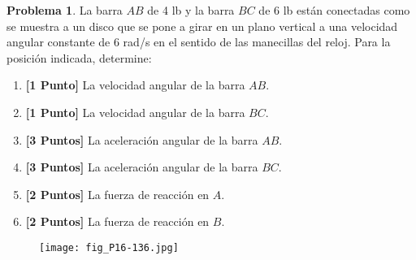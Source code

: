 \documentclass[ a4paper, twoside, 11pt]{article}
\theoremstyle{definition}
\newtheorem{problem}[definition]{Problema}
\begin{document}
\begin{problem}
La barra $AB$ de 4 lb y la barra $BC$ de 6 lb est\'an conectadas como se muestra a un disco que se pone a girar en un plano vertical a una velocidad angular constante de 6 rad/s \linebreak en el sentido de las manecillas del reloj. Para la posici\'on indicada, determine: 
\begin{enumerate}[label=\alph*.]
\item \textbf{[1 Punto]} La velocidad angular de la barra $AB$. 
\item \textbf{[1 Punto]} La velocidad angular de la barra $BC$. 
\item \textbf{[3 Puntos]} La aceleraci\'on angular de la barra $AB$. 
\item \textbf{[3 Puntos]} La aceleraci\'on angular de la barra $BC$. 
\item \textbf{[2 Puntos]} La fuerza de reacci\'on en $A$. 
\item \textbf{[2 Puntos]} La fuerza de reacci\'on en $B$. 
\end{enumerate}

\begin{figure}[htb]
\centering
\texttt{[image: fig\_P16-136.jpg]}
\end{figure}

\end{problem}
\vspace{\baselineskip}
\end{document}
